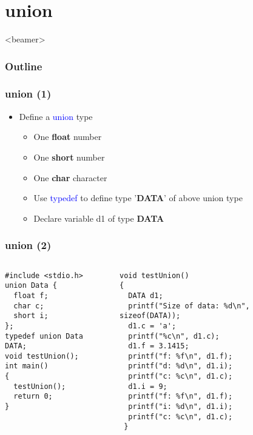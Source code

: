 \section{union}
\label{sec:union}
\begin{frame}<beamer>
    \frametitle{Outline}
    \tableofcontents[currentsection]
\end{frame}
\begin{frame}
\frametitle{union (1)}
\begin{itemize}
	\item {Define a \textcolor{blue}{union} type}
	\begin{itemize}
		\item {One \textbf{float} number}	
		\item {One \textbf{short} number}
		\item {One \textbf{char} character}
	\end{itemize}
	\begin{itemize}
		\item {Use \textcolor{blue}{typedef} to define type '\textbf{DATA}' of above union type}
		\item {Declare variable d1 of type \textbf{DATA}}
	\end{itemize}

\end{itemize}
\end{frame}

\ifx\answers\undefined
\begin{frame}[fragile]
\frametitle{union (2)}
\vspace{-0.15in}
\begin{columns}
\begin{column}{0.440\linewidth}
\begin{lstlisting}[xleftmargin=0.05\linewidth]
#include <stdio.h>
union Data {
  float f;
  char c;
  short i;
};
typedef union Data DATA;
void testUnion();
int main()
{
  testUnion();
  return 0;
}
\end{lstlisting}
\end{column}
\begin{column}{0.56\linewidth}
	\begin{lstlisting}[xleftmargin=0.05\linewidth]
void testUnion()
{
  DATA d1;
  printf("Size of data: %d\n", sizeof(DATA));
  d1.c = 'a';
  printf("%c\n", d1.c);
  d1.f = 3.1415;
  printf("f: %f\n", d1.f);
  printf("d: %d\n", d1.i);
  printf("c: %c\n", d1.c);
  d1.i = 9;
  printf("f: %f\n", d1.f);
  printf("i: %d\n", d1.i);
  printf("c: %c\n", d1.c);
 }
\end{lstlisting}
\end{column}
\end{columns}
\end{frame}
\fi



